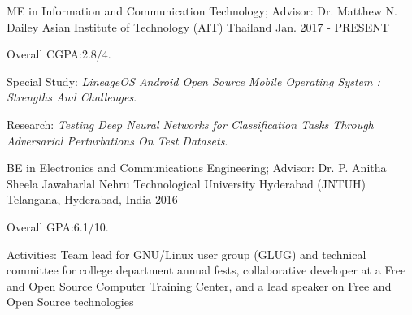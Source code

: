 \begin{cventries}
  \cventry
    {ME in Information and Communication Technology; Advisor: Dr. Matthew N. Dailey}
    {Asian Institute of Technology (AIT)}
    {Thailand}
    {Jan. 2017 - PRESENT}
    {
      \begin{cvitems}
        \item Overall CGPA:2.8/4.
        \item {Special Study: \textit{LineageOS Android Open Source Mobile Operating System : Strengths And Challenges}.}
        \item {Research: \textit{Testing Deep Neural Networks for Classification Tasks Through Adversarial Perturbations On Test Datasets}.}
      \end{cvitems}
    }
    \cventry
    {BE in Electronics and Communications Engineering; Advisor: Dr. P. Anitha Sheela}
    {Jawaharlal Nehru Technological University Hyderabad (JNTUH)}
    {Telangana, Hyderabad, India}
    {2016}
    {
        \begin{cvitems}
        \item Overall GPA:6.1/10.
        \item {Activities: Team lead for GNU/Linux user group (GLUG) and technical committee for college department annual fests, collaborative developer at a Free and Open Source Computer Training Center, and a lead speaker on Free and Open Source technologies}
        \end{cvitems}
    }
\end{cventries}